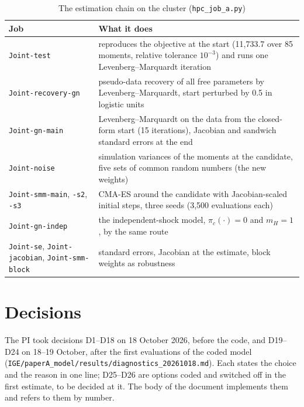 \documentclass[11pt]{article}
\newcommand{\code}[1]{\texttt{#1}}
\newcommand{\1}{\mathbf{1}}
\begin{document}
\begin{table}[htbp]\centering\small
\caption{The estimation chain on the cluster (\code{hpc\_job\_a.py})}\label{tab:build}
\begin{tabular}{L{3.6cm}L{11.0cm}}
\toprule
Job & What it does \\
\midrule
\code{Joint-test} & reproduces the objective at the start (11{,}733.7 over 85 moments, relative tolerance $10^{-3}$) and runs one Levenberg--Marquardt iteration \\
\code{Joint-recovery-gn} & pseudo-data recovery of all free parameters by Levenberg--Marquardt, start perturbed by 0.5 in logistic units \\
\code{Joint-gn-main} & Levenberg--Marquardt on the data from the closed-form start (15 iterations), Jacobian and sandwich standard errors at the end \\
\code{Joint-noise} & simulation variances of the moments at the candidate, five sets of common random numbers (the new weights) \\
\code{Joint-smm-main}, \code{-s2}, \code{-s3} & CMA-ES around the candidate with Jacobian-scaled initial steps, three seeds (3{,}500 evaluations each) \\
\code{Joint-gn-indep} & the independent-shock model, $\pi_c(\cdot) = 0$ and $m_H = 1$, by the same route \\
\code{Joint-se}, \code{Joint-jacobian}, \code{Joint-smm-block} & standard errors, Jacobian at the estimate, block weights as robustness \\
\bottomrule
\end{tabular}
\end{table}

\section{Decisions}\label{sec:decisions}

The PI took decisions D1--D18 on 18 October 2026, before the code, and D19--D24 on 18--19 October, after the first
evaluations of the coded model (\code{IGE/paperA\_model/results/}\allowbreak\code{diagnostics\_20261018.md}). Each states the choice and
the reason in one line; D25--D26 are options coded and switched off in the first estimate, to be decided at it. The body of the document implements them and refers to them by number.
\end{document}
